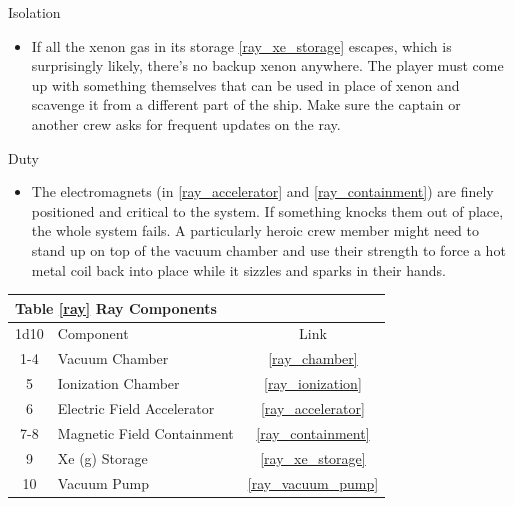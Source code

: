 \documentclass[a4paper]{article}
\begin{document}
\begin{minipage}[t]{0.4\linewidth}
Isolation
\begin{itemize}
\item If all the xenon gas in its storage \ref{ray_xe_storage} escapes, which is surprisingly likely, there's no backup xenon anywhere. The player must come up with something themselves that can be used in place of xenon and scavenge it from a different part of the ship. Make sure the captain or another crew asks for frequent updates on the ray.
\end{itemize}
\end{minipage}
\begin{minipage}[t]{0.4\linewidth}
Duty
\begin{itemize}
\item The electromagnets (in \ref{ray_accelerator} and \ref{ray_containment}) are finely positioned and critical to the system. If something knocks them out of place, the whole system fails. A particularly heroic crew member might need to stand up on top of the vacuum chamber and use their strength to force a hot metal coil back into place while it sizzles and sparks in their hands.
\end{itemize}
\end{minipage}

\vspace{0.5cm} \hspace{0.25\linewidth}
\begin{tabular}{@{} | c | l | c | @{}}
\toprule
\multicolumn{3}{|l|}{Table \ref{ray} Ray Components} \\
\toprule
1d10 & Component & Link \\
\midrule
1-4 & Vacuum Chamber & \ref{ray_chamber} \\
5 & Ionization Chamber & \ref{ray_ionization} \\
6 & Electric Field Accelerator & \ref{ray_accelerator} \\
7-8 & Magnetic Field Containment & \ref{ray_containment} \\
9 & Xe (g) Storage & \ref{ray_xe_storage} \\
10 & Vacuum Pump & \ref{ray_vacuum_pump} \\
\bottomrule
\end{tabular}
\end{document}
